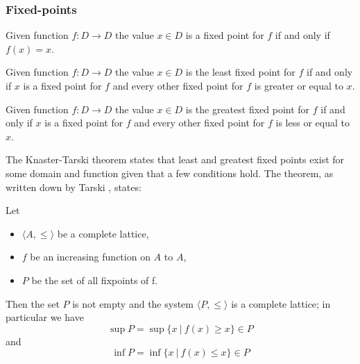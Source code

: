 \subsubsection{Fixed-points}
\begin{definition}
	Given function $f : D \rightarrow D$ the value $x \in D$ is a fixed point for $f$ if and only if $f(x) = x$.
\end{definition}
\begin{definition}
	Given function $f : D \rightarrow D$ the value $x \in D$ is the least fixed point for $f$ if and only if $x$ is a fixed point for $f$ and every other fixed point for $f$ is greater or equal to $x$.
\end{definition}
\begin{definition}
	Given function $f : D \rightarrow D$ the value $x \in D$ is the greatest fixed point for $f$ if and only if $x$ is a fixed point for $f$ and every other fixed point for $f$ is less or equal to $x$.
\end{definition}
The Knaster-Tarski theorem states that least and greatest fixed points exist for some domain and function given that a few conditions hold.
The theorem, as written down by Tarski \cite{tarski1955}, states:
\begin{theorem}
	\label{the_knaster_tarski}
	Let
	\begin{itemize}
		\item $\langle A, \leq \rangle$ be a complete lattice,
		\item $f$ be an increasing function on $A$ to $A$,
		\item $P$ be the set of all fixpoints of f.
	\end{itemize}
	Then the set $P$ is not empty and the system $\langle P, \leq \rangle$ is a complete lattice; in particular we have 
	\[ \sup P = \sup \{ x\ |\ f(x) \geq x \} \in P \]
	and
	\[ \inf P = \inf \{ x\ |\ f(x) \leq x \} \in P \]
\end{theorem}